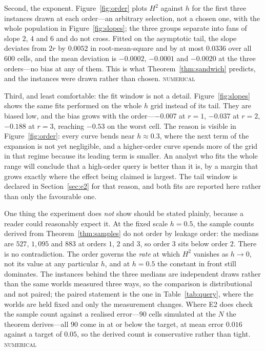 \documentclass[conference]{IEEEtran}
\theoremstyle{definition}
\newcommand{\NUM}{\textsc{numerical}}
\begin{document}
Second, the exponent. Figure~\ref{fig:order} plots $H^{2}$ against $h$ for the first three
instances drawn at each order---an arbitrary selection, not a chosen one, with the whole
population in Figure~\ref{fig:slopes}; the three groups separate into fans of slope $2$, $4$ and $6$ and do
not cross. Fitted on the asymptotic tail, the slope deviates from $2r$ by $0.0052$ in
root-mean-square and by at most $0.0336$ over all $600$ cells, and the mean deviation is
$-0.0002$, $-0.0001$ and $-0.0020$ at the three orders---no bias at any of them. This is what
Theorem~\ref{thm:sandwich} predicts, and the instances were drawn rather than chosen.
\NUM{}

Third, and least comfortable: the fit window is not a detail. Figure~\ref{fig:slopes} shows the
same fits performed on the whole $h$ grid instead of its tail. They are biased low, and the
bias grows with the order---$-0.007$ at $r=1$, $-0.037$ at $r=2$, $-0.188$ at $r=3$, reaching
$-0.53$ on the worst cell. The reason is visible in Figure~\ref{fig:order}: every curve bends
near $h\approx0.3$, where the next term of the expansion is not yet negligible, and a
higher-order curve spends more of the grid in that regime because its leading term is smaller.
An analyst who fits the whole range will conclude that a high-order query is better than it is,
by a margin that grows exactly where the effect being claimed is largest. The tail window is
declared in Section~\ref{sec:e2} for that reason, and both fits are reported here rather than
only the favourable one.

One thing the experiment does \emph{not} show should be stated plainly, because a reader could
reasonably expect it. At the fixed scale $h=0.5$, the sample counts derived from
Theorem~\ref{thm:samples} do not order by leakage order: the medians are $527$, $1{,}095$ and
$883$ at orders $1$, $2$ and $3$, so order $3$ sits below order $2$. There is no contradiction.
The order governs the \emph{rate} at which $H^{2}$ vanishes as $h\to0$, not its value at any
particular $h$, and at $h=0.5$ the constant in front still dominates. The instances behind the
three medians are independent draws rather than the same worlds measured three ways, so the
comparison is distributional and not paired; the paired statement is the one in
Table~\ref{tab:query}, where the worlds are held fixed and only the measurement changes.
Where E2 does check the sample count against a realised error---$90$ cells simulated at the $N$
the theorem derives---all $90$ come in at or below the target, at mean error $0.016$ against a
target of $0.05$, so the derived count is conservative rather than tight. \NUM{}
\end{document}
